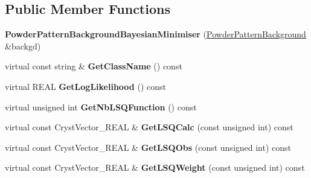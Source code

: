 \subsection*{Public Member Functions}
\begin{DoxyCompactItemize}
\item 
\mbox{\label{class_obj_cryst_1_1_powder_pattern_background_bayesian_minimiser_a38fecc6393f5feed3dd22e585d2fd708}} 
{\bfseries Powder\+Pattern\+Background\+Bayesian\+Minimiser} (\mbox{\hyperlink{class_obj_cryst_1_1_powder_pattern_background}{Powder\+Pattern\+Background}} \&backgd)
\item 
\mbox{\label{class_obj_cryst_1_1_powder_pattern_background_bayesian_minimiser_adde881be1569272ac0e24d570f06a6d0}} 
virtual const string \& {\bfseries Get\+Class\+Name} () const
\item 
\mbox{\label{class_obj_cryst_1_1_powder_pattern_background_bayesian_minimiser_a6fa6a85c92002c23a4e7a781d78dcc21}} 
virtual R\+E\+AL {\bfseries Get\+Log\+Likelihood} () const
\item 
\mbox{\label{class_obj_cryst_1_1_powder_pattern_background_bayesian_minimiser_a7f91be645bb668d83ab4e198c2d343eb}} 
virtual unsigned int {\bfseries Get\+Nb\+L\+S\+Q\+Function} () const
\item 
\mbox{\label{class_obj_cryst_1_1_powder_pattern_background_bayesian_minimiser_a0304bd59d3cb7f3468cf20022d98a34e}} 
virtual const Cryst\+Vector\+\_\+\+R\+E\+AL \& {\bfseries Get\+L\+S\+Q\+Calc} (const unsigned int) const
\item 
\mbox{\label{class_obj_cryst_1_1_powder_pattern_background_bayesian_minimiser_ad99f84375cfb492adb985d5d3233db42}} 
virtual const Cryst\+Vector\+\_\+\+R\+E\+AL \& {\bfseries Get\+L\+S\+Q\+Obs} (const unsigned int) const
\item 
\mbox{\label{class_obj_cryst_1_1_powder_pattern_background_bayesian_minimiser_a2e61e6dc76c1d84c42331a56073bd813}} 
virtual const Cryst\+Vector\+\_\+\+R\+E\+AL \& {\bfseries Get\+L\+S\+Q\+Weight} (const unsigned int) const
\end{DoxyCompactItemize}

